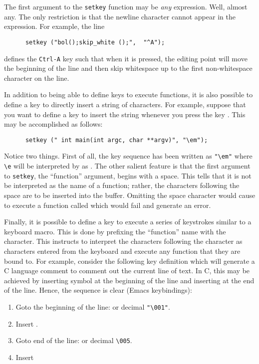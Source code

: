   The first argument to the \verb|setkey| function may be {\em any} \slang
  expression.  Well, almost any.  The only restriction is that the newline
  character cannot appear in the expression.  For example, the line
\begin{verbatim} 
      setkey ("bol();skip_white ();",  "^A");
\end{verbatim}     
  defines the \verb|Ctrl-A| key such that when it is pressed, the editing
  point will move the beginning of the line and then skip whitespace up to
  the first non-whitespace character on the line.
  
  In addition to being able to define keys to execute functions, it is also
  possible to define a key to directly insert a string of characters.  For
  example, suppose that you want to define a key to insert the string
   whenever you press the key 
  .  This may be accomplished as follows:
\begin{verbatim}
      setkey (" int main(int argc, char **argv)", "\em");
\end{verbatim}

  Notice two things.  First of all, the key sequence  has
  been written as \verb|"\em"| where \verb|\e| will be interpreted by \jed{} as
  . The other salient feature is that the first argument to
  \verb|setkey|, the ``function'' argument, begins with a space.  This tells
  \jed{} that it is not be interpreted as the name of a function; rather, the
  characters following the space are to be inserted into the buffer.
  Omitting the space character would cause \jed{} to execute a function called
   which would fail and generate an
  error.

  Finally, it is possible to define a key to execute a series of keystrokes
  similar to a keyboard macro.  This is done by prefixing the ``function''
  name with the  character.  This instructs \jed{} to interpret the
  characters following the  character as characters entered from the
  keyboard and execute any function that they are bound to.  For example,
  consider the following key definition which will generate a C language
  comment to comment out the current line of text.  In C, this may be
  achieved by inserting symbol  at the beginning of the line and
  inserting  at the end of the line.  Hence, the sequence is clear
  (Emacs keybindings):

\begin{enumerate}
\item Goto the beginning of the line:  or decimal \verb|"\001"|.

\item Insert \var{/*}.

\item Goto end of the line:  or decimal \verb|\005|.

\item Insert \var{*/}
\end{enumerate}

